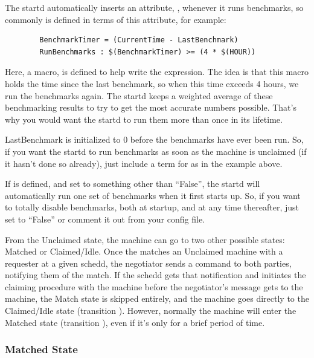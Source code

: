 The startd automatically inserts an attribute, ,
whenever it runs benchmarks, so commonly  is
defined in terms of this attribute, for example:
\begin{verbatim}
        BenchmarkTimer = (CurrentTime - LastBenchmark)
        RunBenchmarks : $(BenchmarkTimer) >= (4 * $(HOUR))
\end{verbatim}
Here, a macro,  is defined to help write the
expression.  The idea is that this macro holds the time since the last
benchmark, so when this time exceeds 4 hours, we run the benchmarks
again.  The startd keeps a weighted average of these benchmarking
results to try to get the most accurate numbers possible.  That's why
you would want the startd to run them more than once in its lifetime.

\Note LastBenchmark is initialized to 0 before the benchmarks
have ever been run.
So, if you want the startd to run benchmarks as soon as the machine is
unclaimed (if it hasn't done so already), just include a term for
 as in the example above.

\Note If  is defined, and set to something
other than ``False'', the startd will automatically run one set of
benchmarks when it first starts up.
So, if you want to totally disable benchmarks, both at startup, and at
any time thereafter, just set  to ``False'' or
comment it out from your config file.

From the Unclaimed state, the machine can go to two other possible
states: Matched or Claimed/Idle.
Once the  matches an Unclaimed machine with a
requester at a given schedd, the negotiator sends a command to both
parties, notifying them of the match.  
If the schedd gets that notification and initiates the claiming
procedure with the machine before the negotiator's message gets to the
machine, the Match state is skipped entirely, and the machine goes
directly to the Claimed/Idle state (transition ).
However, normally the machine will enter the Matched state (transition
), even if it's only for a brief period of time.

\subsubsection{\label{sec:Matched-State}Matched State}

